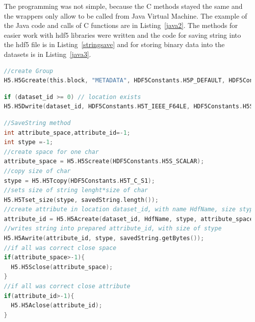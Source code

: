 The programming was not simple, because the C methods stayed the same and the wrappers only allow to be called from Java Virtual Machine. The example of the Java code and calls of C functions are in Listing~\ref{java2}.
The methods for easier work with \gls{hdf5} libraries were written and the code for saving string into the \gls{hdf5} file is in Listing~\ref{stringsave} and for storing binary data into the datasets is in Listing~\ref{java3}.


\newpage
\begin{lstlisting}[language=C,frame=single,caption={Creating Group in HDF5 with Java wrappers. This code creates a new group with the name METADATA at the specified location block},label=java2]
//create Group
H5.H5Gcreate(this.block, "METADATA", HDF5Constants.H5P_DEFAULT, HDF5Constants.H5P_DEFAULT, HDF5Constants.H5P_DEFAULT);

\end{lstlisting}

\begin{lstlisting}[language=C,frame=single,caption={Saving binary data into the dataset. It saves H5T\_IEEE\_F64LE (double) in dset\_data if saving location dataset\_id exists},label=java3]
if (dataset_id >= 0) // location exists
H5.H5Dwrite(dataset_id, HDF5Constants.H5T_IEEE_F64LE, HDF5Constants.H5S_ALL, HDF5Constants.H5S_ALL, HDF5Constants.H5P_DEFAULT, dset_data);
\end{lstlisting}

\begin{lstlisting}[language=C,frame=single,caption={Saving string as attribute in HDF5.},label=stringsave]
//SaveString method
int attribute_space,attribute_id=-1;
int stype =-1;
//create space for one char
attribute_space = H5.H5Screate(HDF5Constants.H5S_SCALAR);
//copy size of char
stype = H5.H5Tcopy(HDF5Constants.H5T_C_S1);	
//sets size of string lenght*size of char
H5.H5Tset_size(stype, savedString.length());
//create attribute in location dataset_id, with name HdfName, size stype
attribute_id = H5.H5Acreate(dataset_id, HdfName, stype, attribute_space, HDF5Constants.H5P_DEFAULT, HDF5Constants.H5P_DEFAULT);
//writes string into prepared attribute_id, with size of stype
H5.H5Awrite(attribute_id, stype, savedString.getBytes());	
//if all was correct close space	
if(attribute_space>-1){
  H5.H5Sclose(attribute_space);
}
//if all was correct close attribute	
if(attribute_id>-1){
  H5.H5Aclose(attribute_id);
}

\end{lstlisting}




